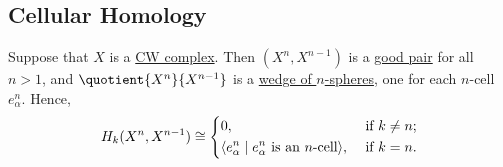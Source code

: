 \subsection{Cellular Homology}
Suppose that \(X\) is a \hyperref[def:CW-Complex]{CW complex}. Then \((X^n, X^{n - 1})\) is a \hyperref[def:good-pair]{good pair} for all \(n > 1\), and
\(\quotient{X^n}{X^{n - 1}}\) is a \hyperref[sssec:Wedge-sum]{wedge of \(n\)-spheres}, one for each \(n\)-cell \(e^n_\alpha\). Hence,
\[
	H_k(X^n, X^{n - 1}) \cong \begin{dcases}
		0,                                                                    & \text{ if } k\neq n ; \\
		\langle e_\alpha^n \mid  e_\alpha^n \text{ is an \(n\)-cell} \rangle, & \text{ if } k = n .
	\end{dcases}
\]

